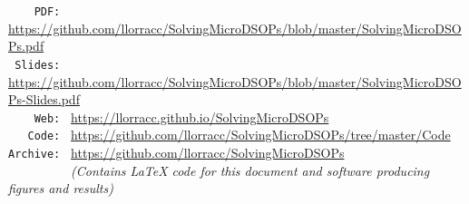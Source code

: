 \documentclass[titlepage, headings=optiontotocandhead]{\econtex}
\begin{document}
\begin{footnotesize}
  \begin{center}
    \begin{tabbing}
      \texttt{~~~~PDF:~} \= \= \url{https://github.com/llorracc/SolvingMicroDSOPs/blob/master/SolvingMicroDSOPs.pdf}  \\  %
      \texttt{~Slides:~} \> \> \url{https://github.com/llorracc/SolvingMicroDSOPs/blob/master/SolvingMicroDSOPs-Slides.pdf} \\
      \texttt{~~~~Web:~} \> \> \url{https://llorracc.github.io/SolvingMicroDSOPs} \\
      \texttt{~~~Code:~} \> \> \url{https://github.com/llorracc/SolvingMicroDSOPs/tree/master/Code} \\
      \texttt{Archive:~} \> \> \url{https://github.com/llorracc/SolvingMicroDSOPs}\\ 
      \texttt{~~~~~~~~~} \> \> \textit{(Contains LaTeX code for this document and software producing figures and results)}
    \end{tabbing}
  \end{center}
\end{footnotesize}

\begin{authorsinfo}
\end{authorsinfo}
\end{document}

